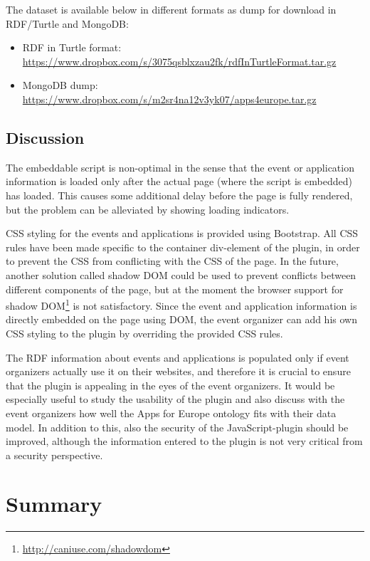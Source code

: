 The dataset is available below in different formats as dump for download in RDF/Turtle and MongoDB:

\begin{itemize}
\item RDF in Turtle format: \\
\url{https://www.dropbox.com/s/3075qsblxzau2fk/rdfInTurtleFormat.tar.gz}
\item MongoDB dump: \url{https://www.dropbox.com/s/m2sr4na12v3yk07/apps4europe.tar.gz}
\end{itemize}

\subsection{Discussion}
The embeddable script is non-optimal in the sense that the event or application information is loaded only after the actual page (where the script is embedded) has loaded. This causes some additional delay before the page is fully rendered, but the problem can be alleviated by showing loading indicators.

CSS styling for the events and applications is provided using Bootstrap. All CSS rules have been made specific to the container div-element of the plugin, in order to prevent the CSS from conflicting with the CSS of the page. In the future, another solution called shadow DOM could be used to prevent conflicts between different components of the page, but at the moment the browser support for shadow DOM\footnote{\url{http://caniuse.com/shadowdom}} is not satisfactory. Since the event and application information is directly embedded on the page using DOM, the event organizer can add his own CSS styling to the plugin by overriding the provided CSS rules.

The RDF information about events and applications is populated only if event organizers actually use it on their websites, and therefore it is crucial to ensure that the plugin is appealing in the eyes of the event organizers. It would be especially useful to study the usability of the plugin and also discuss with the event organizers how well the Apps for Europe ontology fits with their data model. In addition to this, also the security of the JavaScript-plugin should be improved, although the information entered to the plugin is not very critical from a security perspective.

\section{Summary}
\label{sec:summarych5}

